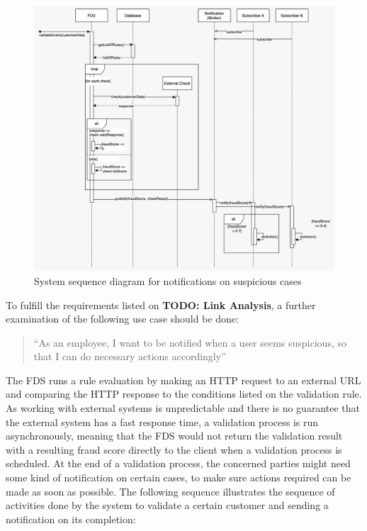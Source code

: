 \begin{figure}[!h]
 \includegraphics[width=\textwidth]{diagrams/sequence_notification.jpeg}
 \caption{System sequence diagram for notifications on suspicious cases}
 \label{fig:notif-sequence}
\end{figure}

To fulfill the requirements listed on \textbf{TODO: Link Analysis}, a further examination of the following use case should be done:

\begin{quotation}
 \enquote{As an employee, I want to be notified when a user seems suspicious, so that I can do necessary actions accordingly} 
\end{quotation}

The FDS runs a rule evaluation by making an HTTP request to an external URL and comparing the HTTP response to the conditions listed on the validation rule. As working with external systems is unpredictable and there is no guarantee that the external system has a fast response time, a validation process is run asynchronously, meaning that the FDS would not return the validation result with a resulting fraud score directly to the client when a validation process is scheduled. At the end of a validation process, the concerned parties might need some kind of notification on certain cases, to make sure actions required can be made as soon as possible. The following sequence illustrates the sequence of activities done by the system to validate a certain customer and sending a notification on its completion:

